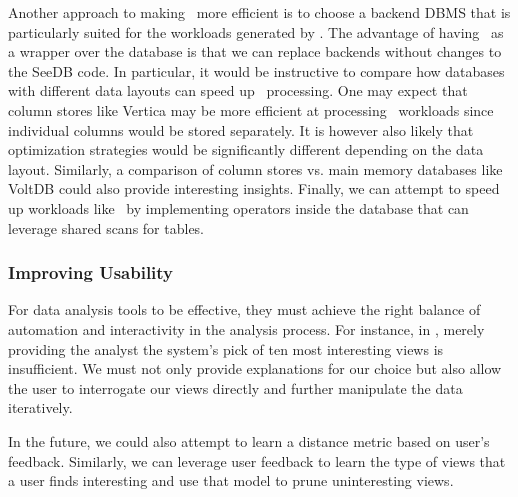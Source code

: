 Another approach to making \SeeDB\ more efficient is to choose a backend DBMS
that is particularly suited for the workloads generated by \SeeDB.
The advantage of having \SeeDB\ as a wrapper over
the database is that we can replace backends without changes to the SeeDB code.
In particular, it would be instructive to compare how databases with different
data layouts can speed up \SeeDB\ processing. One may expect that column stores
like Vertica may be more efficient at processing \SeeDB\ workloads since
individual columns would be stored separately. It is however also likely that
optimization strategies would be significantly different depending on
the data layout.
Similarly, a comparison of column stores vs. main memory databases like VoltDB
could also provide interesting insights.
Finally, we can attempt to speed up workloads like \SeeDB\ by implementing
operators inside the database that can leverage shared scans for tables. 

\subsubsection{Improving Usability} 
For data analysis tools to be effective,
they must achieve the right balance of automation and interactivity in the analysis
process.
For instance, in \SeeDB, merely providing the analyst the system's pick of ten
most interesting views is insufficient. We must not only provide explanations
for our choice but also allow the user to interrogate our views directly and
further manipulate the data iteratively. 

In the future, we could also attempt to learn a distance metric based on user's
feedback. Similarly, we can leverage user feedback to learn the type of views
that a user finds interesting and use that model to prune uninteresting views.


